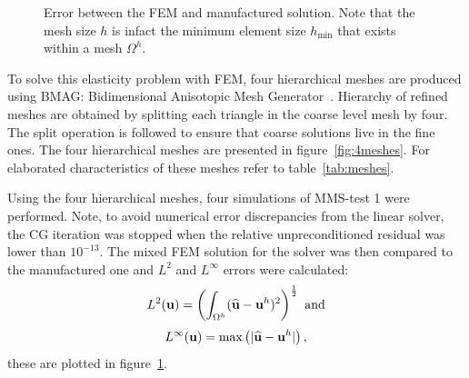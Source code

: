 \documentclass{report}
\newcommand{\bu}{\textbf{u}}
\newcommand{\wbu}{\widehat{\textbf{u}}}
\def\bu{{\bf{u}}}
\newcommand{\logLogSlopeTriangle}[5]
{

    \pgfplotsextra
    {
        \pgfkeysgetvalue{/pgfplots/xmin}{\xmin}
        \pgfkeysgetvalue{/pgfplots/xmax}{\xmax}
        \pgfkeysgetvalue{/pgfplots/ymin}{\ymin}
        \pgfkeysgetvalue{/pgfplots/ymax}{\ymax}

        \pgfmathsetmacro{\xArel}{#1}
        \pgfmathsetmacro{\yArel}{#3}
        \pgfmathsetmacro{\xBrel}{#1-#2}
        \pgfmathsetmacro{\yBrel}{\yArel}
        \pgfmathsetmacro{\xCrel}{\xArel}

        \pgfmathsetmacro{\lnxB}{\xmin*(1-(#1-#2))+\xmax*(#1-#2)} %
        \pgfmathsetmacro{\lnxA}{\xmin*(1-#1)+\xmax*#1} %
        \pgfmathsetmacro{\lnyA}{\ymin*(1-#3)+\ymax*#3} %
        \pgfmathsetmacro{\lnyC}{\lnyA+#4*(\lnxA-\lnxB)}
        \pgfmathsetmacro{\yCrel}{\lnyC-\ymin)/(\ymax-\ymin)} %

        \coordinate (A) at (rel axis cs:\xArel,\yArel);
        \coordinate (B) at (rel axis cs:\xBrel,\yBrel);
        \coordinate (C) at (rel axis cs:\xCrel,\yCrel);

        \draw[#5]   (A)-- node[pos=0.5,inner sep=2pt,anchor=north] {\scriptsize 1}
                    (B)-- 
                    (C)-- node[pos=0.5,inner sep=2pt,anchor=west] {\scriptsize #4}
                    cycle;
    }
}
\begin{document}
\begin{figure}[h]
\centering
{}
\caption{Error between the FEM and manufactured solution. Note that the mesh size $h$ is infact the minimum element size $h_{\min}$ that exists within a mesh $\Omega^{h}$.}\label{fig:error}
\end{figure}

To solve this elasticity problem with FEM, four hierarchical meshes are produced using BMAG: Bidimensional Anisotopic Mesh Generator~\cite{hecht1998bamg}. Hierarchy of refined meshes are obtained by splitting each triangle in the coarse level mesh by four. The split operation is followed to ensure that coarse solutions live in the fine ones. The four hierarchical meshes are presented in figure~\ref{fig:4meshes}. For elaborated characteristics of these meshes refer to table~\ref{tab:meshes}.   

Using the four hierarchical meshes, four simulations of MMS-test 1 were performed. Note, to avoid numerical error discrepancies from the linear solver, the CG iteration was stopped when the relative unpreconditioned residual was lower than $10^{-13}$. The mixed FEM solution for the solver was then compared to the manufactured one and $L^2$ and $L^\infty$ errors were calculated:
\begin{equation}
L^2(\bu)=\left( \int_{\Omega^h} (\wbu-\bu^h)^2\right)^{\frac{1}{2}}\text{ and}
\end{equation}
\begin{equation}
L^\infty(\bu)=\text{max}\left( |\wbu-\bu^h|\right),
\end{equation}
 these are plotted in figure~\ref{fig:error}.  
 
\end{document}
